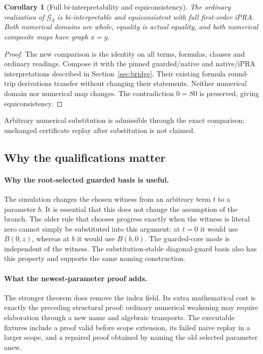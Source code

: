 \documentclass[11pt,letterpaper]{article}
\newtheorem{corollary}[theorem]{Corollary}
\theoremstyle{definition}\newtheorem{definition}[theorem]{Definition}
\theoremstyle{remark}\newtheorem{remark}[theorem]{Remark}
\begin{document}
\begin{corollary}[Full bi-interpretability and equiconsistency]
The ordinary realization of $\mathcal G_{\mathrm d}$ is bi-interpretable
and equiconsistent with full first-order iPRA. Both numerical domains are
whole, equality is actual equality, and both numerical composite maps have
graph $x=y$.
\end{corollary}
\begin{proof}
The new comparison is the identity on all terms, formulas, clauses and
ordinary readings. Compose it with the pinned guarded/native and native/iPRA
interpretations described in Section~\ref{sec:bridge}. Their existing formula
round-trip derivations transfer without changing their statements. Neither
numerical domain nor numerical map changes. The contradiction $0=S0$ is
preserved, giving equiconsistency.
\end{proof}
Arbitrary numerical substitution is admissible through the exact comparison;
unchanged certificate replay after substitution is not claimed.

\subsection{Why the qualifications matter}

\paragraph{Why the root-selected guarded basis is useful.}
The simulation changes the chosen witness from an arbitrary term $t$ to a
parameter $b$. It is essential that this does not change the assumption of
the branch. The older rule that chooses progress exactly when the witness
is literal zero cannot simply be substituted into this argument: at $t=0$
it would use $B(0,z)$, whereas at $b$ it would use $B(b,0)$. The guarded-core
mode is independent of the witness. The substitution-stable diagonal-guard
basis also has this property and supports the same naming construction.

\paragraph{What the newest-parameter proof adds.}
The stronger theorem does remove the index field. Its extra mathematical
cost is exactly the preceding structural proof: ordinary numerical weakening
may require elaboration through a new name and algebraic transports. The
executable fixtures include a proof valid before scope extension, its failed
naive replay in a larger scope, and a repaired proof obtained by naming the
old selected parameter anew.
\end{document}

